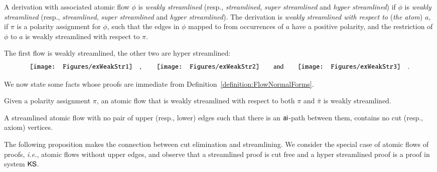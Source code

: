 \begin{definition}\label{definition:DerStreamlined}
A derivation with associated atomic flow $\phi$ is \emph{weakly streamlined} (resp., \emph{streamlined}, \emph{super streamlined} and \emph{hyper streamlined}) if $\phi$ is \emph{weakly streamlined} (resp., \emph{streamlined}, \emph{super streamlined} and \emph{hyper streamlined}). The derivation is \emph{weakly streamlined with respect to} (\emph{the atom}) $a$, if $\pi$ is a polarity assignment for $\phi$, such that the edges in $\phi$ mapped to from occurrences of $a$ have a positive polarity, and the restriction of $\phi$ to $a$ is weakly streamlined with respect to $\pi$.
\end{definition}

\begin{example}\label{example:Streamlined}
The first flow is weakly streamlined, the other two are hyper streamlined:
\[
\vcenter{\hbox{\texttt{[image: Figures/exWeakStr1]}}}
\quad,\qquad
\vcenter{\hbox{\texttt{[image: Figures/exWeakStr2]}}}
\qquad\hbox{and}\qquad
\vcenter{\hbox{\texttt{[image: Figures/exWeakStr3]}}}
\quad.
\]
\end{example}

We now state some facts whose proofs are immediate from Definition~\vref{definition:FlowNormalForms}.

\begin{proposition}\label{proposition:FlowWeaklyStreamlinedPolarity}
Given a polarity assignment $\pi$, an atomic flow that is weakly streamlined with respect to both $\pi$ and $\bar\pi$ is weakly streamlined. 
\end{proposition}

\begin{proposition}\label{proposition:FlowCutFree}
A streamlined atomic flow with no pair of upper (resp., lower) edges such that there is an ${\mathsf{ai}}$-path between them, contains no cut (resp., axiom) vertices.
\end{proposition}

The following proposition makes the connection between cut elimination and streamlining. We consider the special case of atomic flows of proofs, \emph{i.e.}, atomic flows without upper edges, and observe that a streamlined proof is cut free and a hyper streamlined proof is a proof in system $\mathsf{KS}$.

